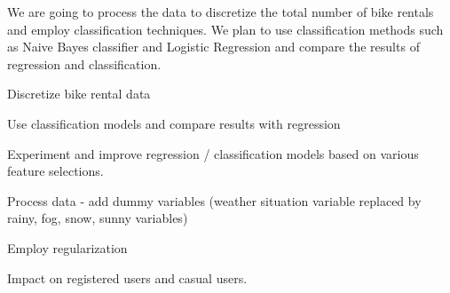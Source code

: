 \documentclass[12pt]{article}
\newcommand{\bibfile}{GroupProject}
\begin{document}
We are going to process the data to discretize the total number of bike rentals
and employ classification techniques. We plan to use classification methods
such as Naive Bayes classifier and Logistic Regression and compare the results
of regression and classification.


\begin{packedlist}
\item Discretize bike rental data 
\item Use classification models and compare results with regression
\item Experiment and improve regression / classification models based on various feature selections.
\item Process data - add dummy variables (weather situation variable replaced by rainy, fog, snow, sunny variables)
\item Employ regularization
\item Impact on registered users and casual users.
\end{packedlist}



\end{document}
